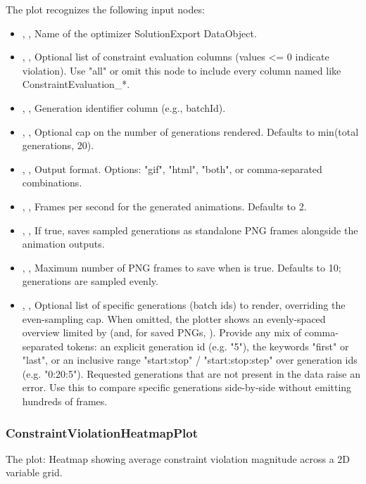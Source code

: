 The  plot recognizes the following input nodes:
\begin{itemize}
  \item {}, , Name of the optimizer SolutionExport DataObject.
  \item {}, , Optional list of constraint evaluation columns (values \textless{}= 0 indicate violation). Use "all" or omit this node to include every column named like ConstraintEvaluation\_*.
  \item {}, , Generation identifier column (e.g., batchId).
  \item {}, , Optional cap on the number of generations rendered. Defaults to min(total generations, 20).
  \item {}, , Output format. Options: "gif", "html", "both", or comma-separated combinations.
  \item {}, , Frames per second for the generated animations. Defaults to 2.
  \item {}, , If true, saves sampled generations as standalone PNG frames alongside the animation outputs.
  \item {}, , Maximum number of PNG frames to save when  is true. Defaults to 10; generations are sampled evenly.
  \item {}, , Optional list of specific generations (batch ids) to render, overriding the even-sampling cap. When omitted, the plotter shows an evenly-spaced overview limited by  (and, for saved PNGs, ). Provide any mix of comma-separated tokens: an explicit generation id (e.g. "5"), the keywords "first" or "last", or an inclusive range "start:stop" / "start:stop:step" over generation ids (e.g. "0:20:5"). Requested generations that are not present in the data raise an error. Use this to compare specific generations side-by-side without emitting hundreds of frames.
\end{itemize}

\subsubsection{ConstraintViolationHeatmapPlot}
The   plot: Heatmap showing average constraint violation magnitude across a 2D variable grid.

